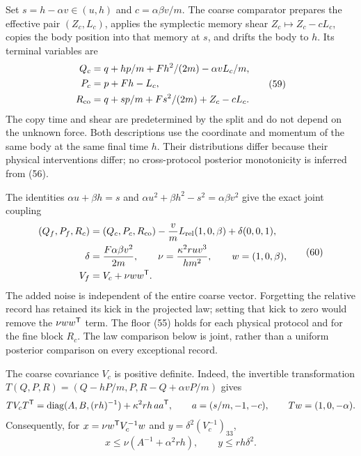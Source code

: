 \documentclass[11pt,a4paper]{article}
\begin{document}
Set \(s=h-\alpha v\in(u,h)\) and \(c=\alpha\beta v/m\). The coarse
comparator prepares the effective pair \((Z_c,L_c)\), applies the
symplectic memory shear \(Z_c\mapsto Z_c-cL_c\), copies the body
position into that memory at \(s\), and drifts the body to \(h\). Its
terminal variables are \[\begin{aligned}
Q_c&=q+hp/m+Fh^2/(2m)-\alpha v L_c/m,\\
P_c&=p+Fh-L_c,\\
R_{\rm co}&=q+sp/m+Fs^2/(2m)+Z_c-cL_c.
\end{aligned}\tag{59}\] The copy time and shear are predetermined by the
split and do not depend on the unknown force. Both descriptions use the
coordinate and momentum of the same body at the same final time \(h\).
Their distributions differ because their physical interventions differ;
no cross-protocol posterior monotonicity is inferred from (56).

The identities \(\alpha u+\beta h=s\) and
\(\alpha u^2+\beta h^2-s^2=\alpha\beta v^2\) give the exact joint
coupling \[\begin{aligned}
(Q_f,P_f,R_c)
 &=(Q_c,P_c,R_{\rm co})-\frac v m L_{\rm rel}(1,0,\beta)
                         +\delta(0,0,1),\\
\delta&=\frac{F\alpha\beta v^2}{2m},\qquad
\nu=\frac{\kappa^2ruv^3}{hm^2},\qquad w=(1,0,\beta),\\
V_f&=V_c+\nu ww^{\sf T}.
\end{aligned}\tag{60}\] The added noise is independent of the entire
coarse vector. Forgetting the relative record has retained its kick in
the projected law; setting that kick to zero would remove the
\(\nu ww^{\sf T}\) term. The floor (55) holds for each physical protocol
and for the fine block \(R_c\). The law comparison below is joint,
rather than a uniform posterior comparison on every exceptional record.

The coarse covariance \(V_c\) is positive definite. Indeed, the
invertible transformation \(T(Q,P,R)=(Q-hP/m,P,R-Q+\alpha v P/m)\) gives
\[TV_cT^{\sf T}
=\operatorname{diag}(A,B,(rh)^{-1})
  +\kappa^2rh\,aa^{\sf T},\qquad
a=(s/m,-1,-c),\qquad Tw=(1,0,-\alpha).\] Consequently, for
\(x=\nu w^{\sf T}V_c^{-1}w\) and \(y=\delta^2(V_c^{-1})_{33}\),
\[x\le\nu(A^{-1}+\alpha^2rh),\qquad y\le rh\delta^2.\]
\end{document}

